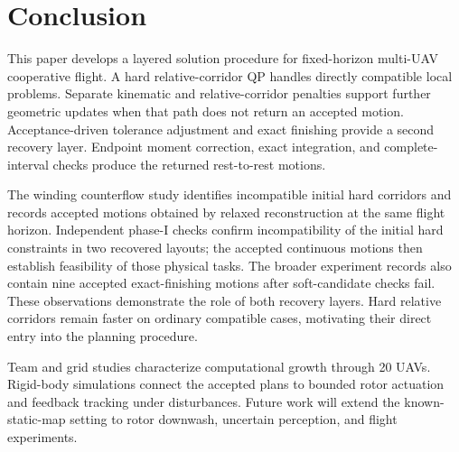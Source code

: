 \section{Conclusion}
This paper develops a layered solution procedure for fixed-horizon multi-UAV cooperative flight. A hard relative-corridor QP handles directly compatible local problems. Separate kinematic and relative-corridor penalties support further geometric updates when that path does not return an accepted motion. Acceptance-driven tolerance adjustment and exact finishing provide a second recovery layer. Endpoint moment correction, exact integration, and complete-interval checks produce the returned rest-to-rest motions.

The winding counterflow study identifies incompatible initial hard corridors and records accepted motions obtained by relaxed reconstruction at the same flight horizon. Independent phase-I checks confirm incompatibility of the initial hard constraints in two recovered layouts; the accepted continuous motions then establish feasibility of those physical tasks. The broader experiment records also contain nine accepted exact-finishing motions after soft-candidate checks fail. These observations demonstrate the role of both recovery layers. Hard relative corridors remain faster on ordinary compatible cases, motivating their direct entry into the planning procedure.

Team and grid studies characterize computational growth through 20 UAVs. Rigid-body simulations connect the accepted plans to bounded rotor actuation and feedback tracking under disturbances. Future work will extend the known-static-map setting to rotor downwash, uncertain perception, and flight experiments.
